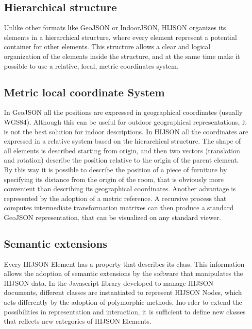 \documentclass{sig-alternate}
\begin{document}
\subsection{Hierarchical structure}\label{hierarchical-structure}

Unlike other formats like GeoJSON or IndoorJSON, HIJSON organizes its elements in a hierarchical structure, where every element represent a potential container for other elements. This structure allows a clear and logical organization of the elements inside the structure, and at the same time make it possible to use a relative, local, metric coordinates system.

\subsection{Metric local coordinate System}\label{metric-local-coordinate-system}

In GeoJSON all the positions are expressed in geographical coordinates (usually WGS84). Although this can be useful for outdoor geographical representations, it is not the best solution for indoor descriptions. In HIJSON all the coordinates are expressed in a relative system based on the hierarchical structure. The shape of all elements is described starting from origin, and then two vectors (translation and rotation) describe the position relative to the origin of the parent element. By this way it is possible to describe the position of a piece of furniture by specifying its distance from the origin of the room, that is obviously more convenient than describing its geographical coordinates. Another advantage is represented by the adoption of a metric reference. A recursive process that computes intermediate transformation matrixes can then produce a standard GeoJSON representation, that can be visualized on any standard viewer.

\subsection{Semantic extensions}\label{semantic-extensions}

Every HIJSON Element has a property that describes its class. This information allows the adoption of semantic extensions by the software that manipulates the HIJSON data. In the Javascript library developed to manage HIJSON documents, different classes are instantiated to represent HIJSON Nodes, which acts differently by the adoption of polymorphic methods. Ino rder to extend the possibilities in representation and interaction, it is sufficient to define new classes that reflects new categories of HIJSON Elements.
\end{document}
